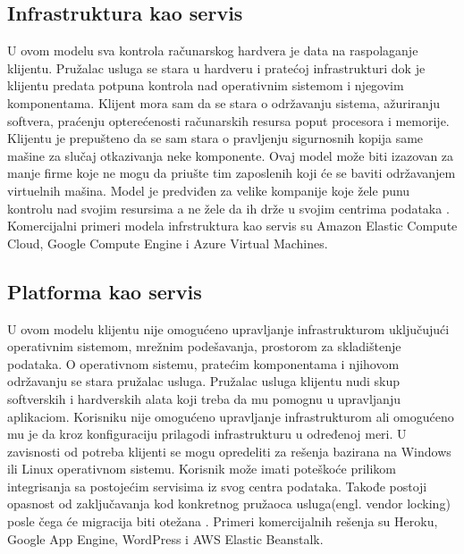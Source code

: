 \documentclass[12pt,oneside]{memoir}
\begin{document}
\subsection{Infrastruktura kao servis}

U ovom modelu sva kontrola računarskog hardvera je data na raspolaganje klijentu. Pružalac usluga se stara u hardveru i pratećoj infrastrukturi dok je klijentu predata potpuna kontrola nad operativnim sistemom i njegovim komponentama. Klijent mora sam da se stara o održavanju sistema, ažuriranju softvera, praćenju opterećenosti računarskih resursa poput procesora i memorije. Klijentu je prepušteno da se sam stara o pravljenju sigurnosnih kopija same mašine za slučaj otkazivanja neke komponente. Ovaj model može biti izazovan za manje firme koje ne mogu da priušte tim zaposlenih koji će se baviti održavanjem virtuelnih mašina. Model je predviđen za velike kompanije koje žele punu kontrolu nad svojim resursima a ne žele da ih drže u svojim centrima podataka \cite{cc}. Komercijalni primeri modela infrstruktura kao servis su Amazon Elastic Compute Cloud, Google Compute Engine i Azure Virtual Machines. 

 
\subsection{Platforma kao servis}
U ovom modelu klijentu nije omogućeno upravljanje infrastrukturom uključujući operativnim sistemom, mrežnim podešavanja, prostorom za skladištenje podataka. O operativnom sistemu, pratećim komponentama i njihovom održavanju se stara pružalac usluga. Pružalac usluga klijentu nudi skup softverskih i hardverskih alata koji treba da mu pomognu u upravljanju aplikaciom. Korisniku nije omogućeno upravljanje infrastrukturom ali omogućeno mu je da kroz konfiguraciju prilagodi infrastrukturu u određenoj meri. U zavisnosti od potreba klijenti se mogu opredeliti za rešenja bazirana na Windows ili Linux operativnom sistemu. Korisnik može imati poteškoće prilikom integrisanja sa postojećim servisima iz svog centra podataka. Takođe postoji opasnost od zaključavanja kod konkretnog pružaoca usluga(engl. vendor locking) posle čega će migracija biti otežana \cite{cc}. Primeri komercijalnih rešenja su Heroku, Google App Engine, WordPress i AWS Elastic Beanstalk. %
\end{document}
